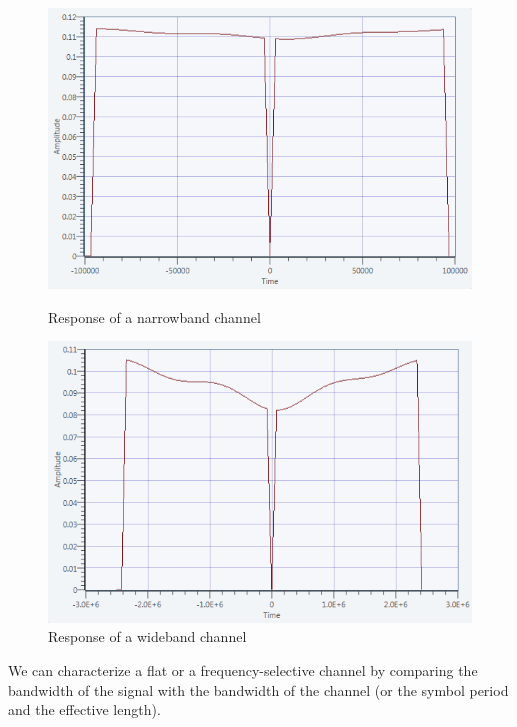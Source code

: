 \documentclass[frenchb, oneside, headings=normal]{scrartcl}
\begin{document}
\begin{figure}[!ht]
    \begin{minipage}[b]{0.48\linewidth}
        \centering \includegraphics[scale=0.45]{img/channel_response_narrow.png}
     \caption{Response of a narrowband channel}
     \label{fig2}
    \end{minipage}\hfill
    \begin{minipage}[b]{0.48\linewidth}
         \centering \includegraphics[scale=0.45]{img/channel_response_wideband.png}
 \caption{Response of a wideband channel}\label{fig3}
    \end{minipage}
\end{figure}


We can characterize a flat or a frequency-selective channel by comparing the bandwidth of the signal with the bandwidth of the channel (or the symbol period and the effective length).\\
\end{document}

